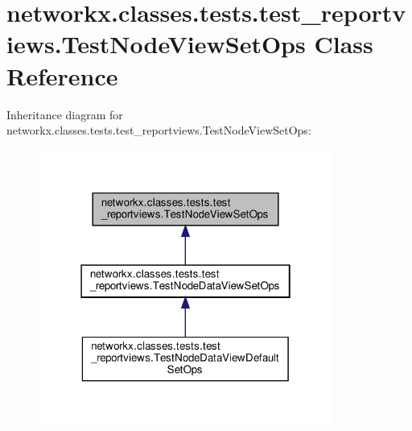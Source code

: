 \hypertarget{classnetworkx_1_1classes_1_1tests_1_1test__reportviews_1_1TestNodeViewSetOps}{}\section{networkx.\+classes.\+tests.\+test\+\_\+reportviews.\+Test\+Node\+View\+Set\+Ops Class Reference}
\label{classnetworkx_1_1classes_1_1tests_1_1test__reportviews_1_1TestNodeViewSetOps}


Inheritance diagram for networkx.\+classes.\+tests.\+test\+\_\+reportviews.\+Test\+Node\+View\+Set\+Ops\+:
\nopagebreak
\begin{figure}[H]
\begin{center}
\leavevmode
\includegraphics[width=274pt]{classnetworkx_1_1classes_1_1tests_1_1test__reportviews_1_1TestNodeViewSetOps__inherit__graph}
\end{center}
\end{figure}
